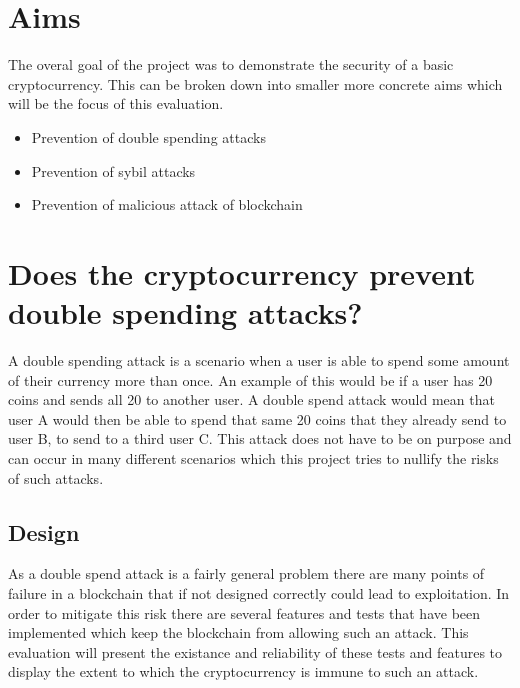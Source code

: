 \documentclass{l4proj}
\begin{document}



\section{Aims}
The overal goal of the project was to demonstrate the security of a basic cryptocurrency. This can be broken down into
smaller more concrete aims which will be the focus of this evaluation.
\begin{itemize}
    \item Prevention of double spending attacks
    \item Prevention of sybil attacks
    \item Prevention of malicious attack of blockchain
\end{itemize}

\section{Does the cryptocurrency prevent double spending attacks?}
A double spending attack is a scenario when a user is able to spend some amount of their currency more than once. An example
of this would be if a user has 20 coins and sends all 20 to another user. A double spend attack would mean that user A would
then be able to spend that same 20 coins that they already send to user B, to send to a third user C. This attack does not have
to be on purpose and can occur in many different scenarios which this project tries to nullify the risks of such attacks.

\subsection{Design}
As a double spend attack is a fairly general problem there are many points of failure in a blockchain that if not designed
correctly could lead to exploitation. In order to mitigate this risk there are several features and tests that have been
implemented which keep the blockchain from allowing such an attack. This evaluation will present the existance and 
reliability of these tests and features to display the extent to which the cryptocurrency is immune to such an attack.
\end{document}
